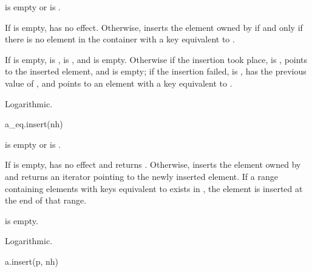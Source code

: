 \begin{itemdescr}
\pnum
\result
{}

\pnum
\expects
{} is empty or
 is .

\pnum
\effects
If  is empty, has no effect.
Otherwise, inserts the element owned by  if and only if
there is no element in the container with a key equivalent to .

\pnum
\returns
If  is empty,  is ,
 is , and  is empty.
Otherwise if the insertion took place,  is ,
 points to the inserted element, and  is empty;
if the insertion failed,  is ,
 has the previous value of , and
 points to an element with a key equivalent to .

\pnum
\complexity
Logarithmic.
\end{itemdescr}

%
\begin{itemdecl}
a_eq.insert(nh)
\end{itemdecl}

\begin{itemdescr}
\pnum
\result
{}

\pnum
\expects
{} is empty or
 is .

\pnum
\effects
If  is empty, has no effect and returns .
Otherwise, inserts the element owned by  and
returns an iterator pointing to the newly inserted element.
If a range containing elements with keys equivalent to 
exists in ,
the element is inserted at the end of that range.

\pnum
\ensures
{} is empty.

\pnum
\complexity
Logarithmic.
\end{itemdescr}

%
\begin{itemdecl}
a.insert(p, nh)
\end{itemdecl}

